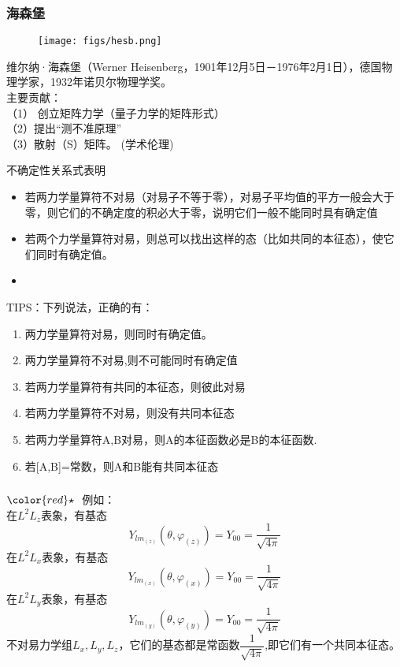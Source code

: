 \begin{frame}
    \frametitle{海森堡}
    \begin{wrapfigure} {r} {0.3\textwidth} %
        \texttt{[image: figs/hesb.png]}   
    \end{wrapfigure}
    维尔纳·海森堡（Werner Heisenberg，1901年12月5日－1976年2月1日），德国物理学家，1932年诺贝尔物理学奖。\\
    主要贡献： \\
    （1） 创立矩阵力学（量子力学的矩阵形式）\\
    （2）提出“测不准原理” \\
    （3）散射（S）矩阵。 (学术伦理)
\end{frame}

\begin{frame} [allowframebreaks=]
    \begin{atcbox}{不确定性关系式表明}
    \begin{itemize}
        \item 若两力学量算符不对易（对易子不等于零），对易子平均值的平方一般会大于零，则它们的不确定度的积必大于零，说明它们一般不能同时具有确定值
        \item 若两个力学量算符对易，则总可以找出这样的态（比如共同的本征态），使它们同时有确定值。 
        \item 
    \end{itemize}   
    \end{atcbox}
\end{frame} 

\begin{frame} [allowframebreaks=]
    TIPS：下列说法，正确的有：
    \begin{enumerate}
        \item 两力学量算符对易，则同时有确定值。 
        \item 两力学量算符不对易,则不可能同时有确定值 
        \item 若两力学量算符有共同的本征态，则彼此对易
        \item 若两力学量算符不对易，则没有共同本征态
        \item 若两力学量算符A,B对易，则A的本征函数必是B的本征函数.
        \item 若[A,B]=常数，则A和B能有共同本征态
    \end{enumerate} 
\end{frame} 
\begin{frame}[label=current]
    \frametitle{}
    ${\color{red}\star}~$ 例如：\\
    在$L^2$$L_z$表象，有基态 $$Y_{lm_{(z)}}(\theta, \varphi_{(z)}) = Y_{00}=\frac{1}{\sqrt{4\pi}}$$
    在$L^2$$L_x$表象，有基态 $$Y_{lm_{(x)}}(\theta, \varphi_{(x)}) = Y_{00}=\frac{1}{\sqrt{4\pi}}$$
    在$L^2$$L_y$表象，有基态 $$Y_{lm_{(y)}}(\theta, \varphi_{(y)}) = Y_{00}=\frac{1}{\sqrt{4\pi}}$$
    不对易力学组{$L_x, L_y, L_z$}，它们的基态都是常函数$\dfrac{1}{\sqrt{4\pi}}$,即它们有一个共同本征态。
  \end{frame} 

